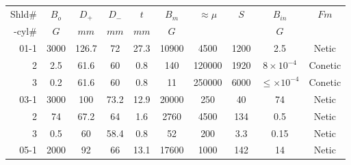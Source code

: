 \documentclass[12pt]{article}
\begin{document}
\begin{table}[htbp]
\begin{center}
\begin{tabular}{|r|c|c|c|c|c|c|c|c|c|} \hline
  Shld#&$B_{o}$&$D_+$&$D_-$&$t$   &$B_m$  &$\approx\mu$&$S$   &$B_{in}$         & $Fm$    \\
  -cyl#&  $G$  &$mm$ &$mm$ &$mm$  &$G$   &            &      &$G$            &          \\ \hline 
01-1    &3000 & 126.7 & 72  & 27.3   & 10900 & 4500       & 1200 & 2.5             & Netic    \\ \hline
 2    &2.5  &61.6 &  60 & 0.8  & 140   & 120000     & 1920 &$8\times10^{-4}$  & Conetic \\ \hline
 3    &0.2  &61.6 &  60 & 0.8  & 11    & 250000     & 6000 &$\leq\times10^{-4}$& Conetic \\ \hline\hline  
03-1    & 3000& 100 &  73.2 & 12.9  &20000 & 250        & 40 &  74           & Netic \\ \hline
 2    & 74 & 67.2  &64 & 1.6  &  2760 & 4500       & 134  &  0.5            & Netic       \\ \hline
 3    & 0.5 &   60 &58.4 &  0.8  &  52  &  200      & 3.3  & 0.15 & Netic      \\ \hline \hline
05-1    & 2000& 92  & 66  & 13.1 & 17600 & 1000       & 142  & 14               & Netic    \\ \hline

\end{tabular}
\end{center}
\end{table}
\end{document}
